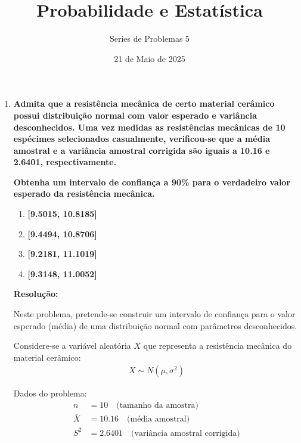 \documentclass[a4paper,12pt]{article}
\author{Series de Problemas 5}
\begin{document}
\title{Probabilidade e Estatística}
\date{21 de Maio de 2025}
\maketitle


\begin{enumerate}
    \item \textbf{Admita que a resistência mecânica de certo material cerâmico possui distribuição normal com valor esperado e variância desconhecidos. Uma vez medidas as resistências mecânicas de 10 espécimes selecionados casualmente, verificou-se que a média amostral e a variância amostral corrigida são iguais a 10.16 e 2.6401, respectivamente.}

    \textbf{Obtenha um intervalo de confiança a 90\% para o verdadeiro valor esperado da resistência mecânica.}

    \vspace{0.3cm}

    \begin{enumerate}[label=\Alph*)]
        \item \textbf{[9.5015, 10.8185]}
        \item \textbf{[9.4494, 10.8706]}
        \item \textbf{[9.2181, 11.1019]}
        \item \textbf{[9.3148, 11.0052]}
    \end{enumerate}

    \vspace{0.3cm}

    \begin{mdframed}[backgroundcolor=gray!10, linewidth=0pt, innertopmargin=10pt, innerbottommargin=10pt]
    \textbf{Resolução:}

    Neste problema, pretende-se construir um intervalo de confiança para o valor esperado (média) de uma distribuição normal com parâmetros desconhecidos.

    Considere-se a variável aleatória $X$ que representa a resistência mecânica do material cerâmico:
    \begin{align*}
    X \sim N(\mu, \sigma^2)
    \end{align*}

    Dados do problema:
    \begin{align*}
    n &= 10 \quad \text{(tamanho da amostra)} \\
    \bar{X} &= 10.16 \quad \text{(média amostral)} \\
    S^2 &= 2.6401 \quad \text{(variância amostral corrigida)}
    \end{align*}


\end{mdframed}
\end{enumerate}
\end{document}
